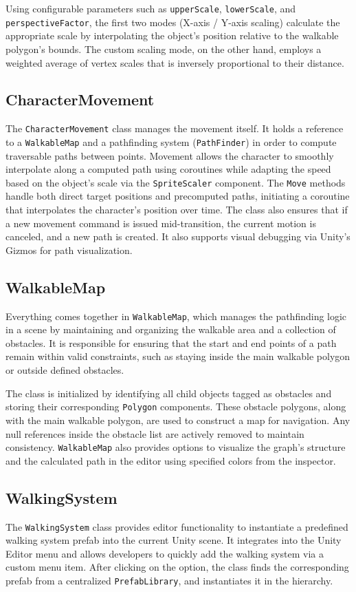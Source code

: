 Using configurable parameters such as \verb|upperScale|, \verb|lowerScale|, and \verb|perspectiveFactor|, the first two modes (X-axis / Y-axis scaling)  calculate the appropriate scale by interpolating the object's position relative to the walkable polygon’s bounds. The custom scaling mode, on the other hand, employs a weighted average of vertex scales that is inversely proportional to their distance. 


\subsection{CharacterMovement}
The \verb|CharacterMovement| class manages the movement itself. It holds a reference to a \verb|WalkableMap| and a pathfinding system (\verb|PathFinder|) in order to compute traversable paths between points. Movement allows the character to smoothly interpolate along a computed path using coroutines while adapting the speed based on the object's scale via the \verb|SpriteScaler| component. The \verb|Move| methods handle both direct target positions and precomputed paths, initiating a coroutine that interpolates the character’s position over time. The class also ensures that if a new movement command is issued mid-transition, the current motion is canceled, and a new path is created. It also supports visual debugging via Unity’s Gizmos for path visualization.

 
\subsection{WalkableMap}
Everything comes together in \verb|WalkableMap|, which manages the pathfinding logic in a scene by maintaining and organizing the walkable area and a collection of obstacles. It is responsible for ensuring that the start and end points of a path remain within valid constraints, such as staying inside the main walkable polygon or outside defined obstacles.

The class is initialized by identifying all child objects tagged as obstacles and storing their corresponding \verb|Polygon| components. These obstacle polygons, along with the main walkable polygon, are used to construct a map for navigation. Any null references inside the obstacle list are actively removed to maintain consistency. \verb|WalkableMap| also provides options to visualize the graph's structure and the calculated path in the editor using specified colors from the inspector.

\subsection{WalkingSystem}
The \verb|WalkingSystem| class provides editor functionality to instantiate a predefined walking system prefab into the current Unity scene. It integrates into the Unity Editor menu and allows developers to quickly add the walking system via a custom menu item. After clicking on the option, the class finds the corresponding prefab from a centralized \verb|PrefabLibrary|, and instantiates it in the hierarchy.


